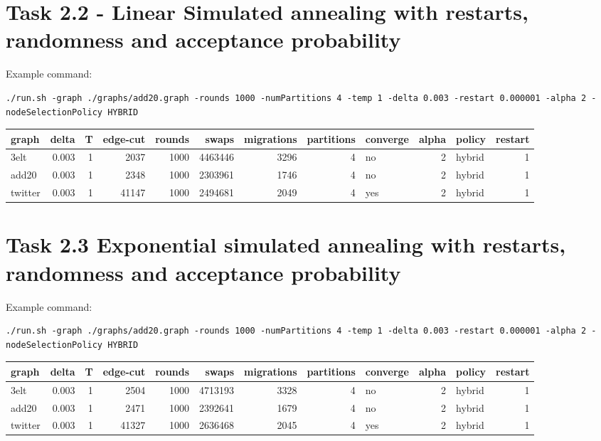 \documentclass[11pt]{article}
\begin{document}
\section{Task 2.2 - Linear Simulated annealing with restarts, randomness and acceptance probability}
\label{sec-4}

Example command:
\begin{verbatim}
./run.sh -graph ./graphs/add20.graph -rounds 1000 -numPartitions 4 -temp 1 -delta 0.003 -restart 0.000001 -alpha 2 -nodeSelectionPolicy HYBRID
\end{verbatim}
\begin{center}
\begin{tabular}{lrrrrrrrlrlr}
graph & delta & T & edge-cut & rounds & swaps & migrations & partitions & converge & alpha & policy & restart\\
\hline
3elt & 0.003 & 1 & 2037 & 1000 & 4463446 & 3296 & 4 & no & 2 & hybrid & 1\\
add20 & 0.003 & 1 & 2348 & 1000 & 2303961 & 1746 & 4 & no & 2 & hybrid & 1\\
twitter & 0.003 & 1 & 41147 & 1000 & 2494681 & 2049 & 4 & yes & 2 & hybrid & 1\\
\end{tabular}
\end{center}

\section{Task 2.3 Exponential simulated annealing with restarts, randomness and acceptance probability}
\label{sec-5}
Example command:

\begin{verbatim}
./run.sh -graph ./graphs/add20.graph -rounds 1000 -numPartitions 4 -temp 1 -delta 0.003 -restart 0.000001 -alpha 2 -nodeSelectionPolicy HYBRID
\end{verbatim}
\begin{center}
\begin{tabular}{lrrrrrrrlrlr}
graph & delta & T & edge-cut & rounds & swaps & migrations & partitions & converge & alpha & policy & restart\\
\hline
3elt & 0.003 & 1 & 2504 & 1000 & 4713193 & 3328 & 4 & no & 2 & hybrid & 1\\
add20 & 0.003 & 1 & 2471 & 1000 & 2392641 & 1679 & 4 & no & 2 & hybrid & 1\\
twitter & 0.003 & 1 & 41327 & 1000 & 2636468 & 2045 & 4 & yes & 2 & hybrid & 1\\
\end{tabular}
\end{center}
\end{document}

